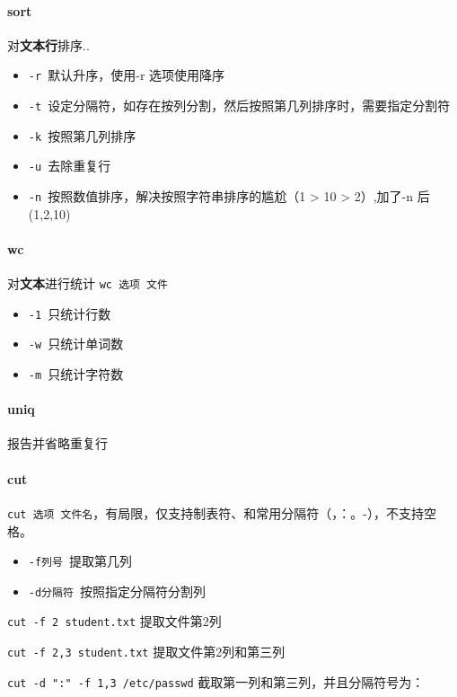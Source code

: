 \documentclass[UTF8,a4paper,12pt]{ctexbook}
\begin{document}
		\paragraph{sort} 对\textbf{文本行}排序..
			\begin{itemize}
				\item \verb|-r |默认升序，使用-r 选项使用降序
				\item \verb|-t |设定分隔符，如存在按列分割，然后按照第几列排序时，需要指定分割符
				\item \verb|-k |按照第几列排序
				\item \verb|-u |去除重复行
				\item \verb|-n |按照数值排序，解决按照字符串排序的尴尬（1 > 10 > 2）,加了-n 后(1,2,10)
			\end{itemize}
		
		\paragraph{wc} 对\textbf{文本}进行统计 \verb|wc 选项 文件|
		
			\begin{itemize}
				\item \verb|-1 |只统计行数
				\item \verb|-w |只统计单词数
				\item \verb|-m |只统计字符数
			\end{itemize}
			
		\paragraph{uniq} 报告并省略重复行
		
		\paragraph{cut}\verb|cut 选项 文件名|，有局限，仅支持制表符、和常用分隔符（，：。-），不支持空格。
			\begin{itemize}
				\item \verb|-f列号 |提取第几列
				\item \verb|-d分隔符 |按照指定分隔符分割列
			\end{itemize}
			
			\verb|cut -f 2 student.txt| 提取文件第2列
			
			\verb|cut -f 2,3 student.txt| 提取文件第2列和第三列
			
			\verb|cut -d ":" -f 1,3 /etc/passwd| 截取第一列和第三列，并且分隔符号为：
		
\end{document}
